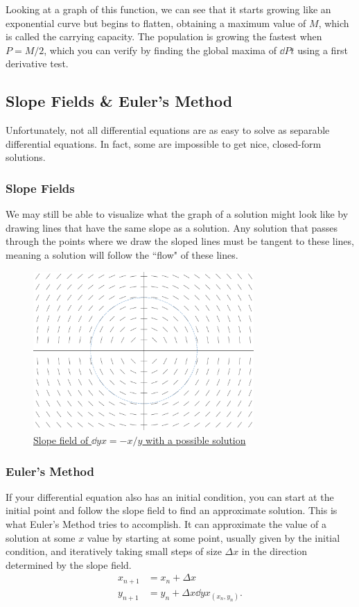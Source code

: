 Looking at a graph of this function, we can see that it starts growing like an exponential curve but begins to flatten, obtaining a maximum value of $M$, which is called the carrying capacity.
The population is growing the fastest when $P=M/2$, which you can verify by finding the global maxima of $\dd{P}{t}$ using a first derivative test.

\subsection{Slope Fields \& Euler's Method}
Unfortunately, not all differential equations are as easy to solve as separable differential equations.
In fact, some are impossible to get nice, closed-form solutions.
\subsubsection{Slope Fields}
We may still be able to visualize what the graph of a solution might look like by drawing lines that have the same slope as a solution.
Any solution that passes through the points where we draw the sloped lines must be tangent to these lines, meaning a solution will follow the ``flow" of these lines.

\begin{figure}[H]
	\label{slope_field}
	\centering
	\includegraphics[width=0.75\textwidth]{./applications_integrals/slope_field.png}
	\caption{\hyperref{}{}{}{Slope field of $\dd{y}{x}=-x/y$ with a possible solution}}
\end{figure}

\subsubsection{Euler's Method}
If your differential equation also has an initial condition, you can start at the initial point and follow the slope field to find an approximate solution.
This is what Euler's Method tries to accomplish.
It can approximate the value of a solution at some $x$ value by starting at some point, usually given by the initial condition, and iteratively taking small steps of size $\Delta x$ in the direction determined by the slope field.
\begin{align*}
	x_{n+1} &= x_n + \Delta x \\
	y_{n+1} &= y_n + \Delta x\dd{y}{x}_{(x_n,y_n)}.
\end{align*}

